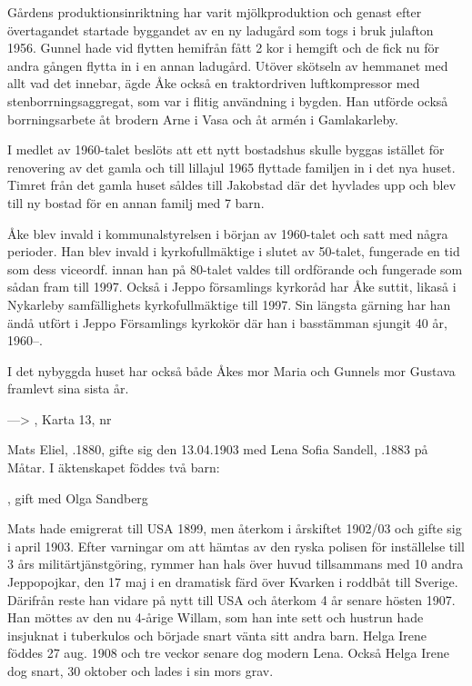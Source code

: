 Gårdens produktionsinriktning har varit mjölkproduktion och genast efter övertagandet startade byggandet av en ny ladugård som togs i bruk julafton 1956. Gunnel hade vid flytten hemifrån fått 2 kor i hemgift och de fick nu för andra gången flytta in i en annan ladugård. Utöver skötseln av hemmanet med allt vad det innebar, ägde Åke också en traktordriven luftkompressor med stenborrningsaggregat, som var i flitig användning i bygden. Han utförde också borrningsarbete åt brodern Arne i Vasa och åt armén i Gamlakarleby.

I medlet av 1960-talet beslöts att ett nytt bostadshus skulle byggas istället för renovering av det gamla och till lillajul 1965 flyttade familjen in i det nya huset. Timret från det gamla huset såldes till Jakobstad där det hyvlades upp och blev till ny bostad för en annan familj med 7 barn.

Åke blev invald i kommunalstyrelsen i början av 1960-talet och satt med några perioder. Han blev invald i kyrkofullmäktige i slutet av 50-talet, fungerade en tid som dess viceordf. innan han på 80-talet valdes till ordförande och fungerade som sådan fram till 1997. Också i Jeppo församlings kyrkoråd har Åke suttit, likaså i Nykarleby samfällighets kyrkofullmäktige till 1997. Sin längsta gärning har han ändå utfört i Jeppo Församlings kyrkokör där han i basstämman sjungit 40 år, 1960--.
\begin{jhchildren}
  \item {}
  \item {}
  \item {}
\end{jhchildren}
I det nybyggda huset har också både Åkes mor Maria och Gunnels mor Gustava framlevt sina sista år.


---> , Karta 13,  nr 



Mats Eliel, .1880, gifte sig den 13.04.1903 med Lena Sofia Sandell, .1883 på Måtar. I äktenskapet föddes två barn:
\begin{jhchildren}
  \item {}, gift med Olga Sandberg
  \item {}
\end{jhchildren}
Mats hade emigrerat till USA 1899, men återkom i årskiftet 1902/03 och gifte sig i april 1903. Efter varningar om att hämtas av den ryska polisen för inställelse till 3 års militärtjänstgöring, rymmer han hals över huvud tillsammans med 10 andra Jeppopojkar, den 17 maj i en dramatisk färd över Kvarken i roddbåt till Sverige. Därifrån reste han vidare på nytt till USA och återkom 4 år senare hösten 1907. Han möttes av den nu 4-årige Willam, som han inte sett och  hustrun hade insjuknat i tuberkulos och började snart vänta sitt andra barn. Helga Irene föddes 27 aug. 1908 och tre veckor senare dog modern Lena. Också Helga Irene dog snart, 30 oktober och lades i sin mors grav.

